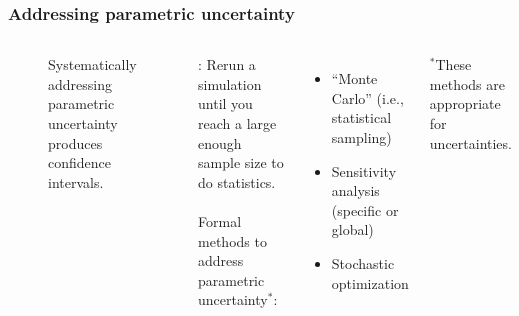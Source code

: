 \begin{frame}
    \frametitle{Addressing parametric uncertainty}

    \begin{columns}
        \column[t]{5cm}
        \begin{figure}
            \centering
            \resizebox{\columnwidth}{!}{
                
            }
            \caption{Systematically addressing parametric uncertainty produces confidence intervals.}
            \label{fig:confidence-intervals}
        \end{figure}

        \column[t]{5cm}
        : Rerun a simulation until you reach a large enough
        sample size to do statistics.\\~\\
        Formal methods to address parametric uncertainty$^*$:
        \begin{itemize}
            \item ``Monte Carlo'' (i.e., statistical sampling)\pause
            \item Sensitivity analysis (specific or global)\pause
            \item Stochastic optimization\pause
        \end{itemize}


        \small{$^*$These methods are appropriate for 
        uncertainties.}
    \end{columns}

\end{frame}

